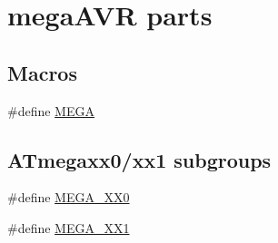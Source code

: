 \hypertarget{group__mega__part__macros__group}{}\section{mega\+A\+VR parts}
\label{group__mega__part__macros__group}
\subsection*{Macros}
\begin{DoxyCompactItemize}
\item 
\#define \mbox{\hyperlink{group__mega__part__macros__group_ga78a6115b485de47c7cc56b224c558ea2}{M\+E\+GA}}
\end{DoxyCompactItemize}
\subsection*{A\+Tmegaxx0/xx1 subgroups}
\begin{DoxyCompactItemize}
\item 
\#define \mbox{\hyperlink{group__mega__part__macros__group_gad59dc6f3c3dc91c94cd1673448135b83}{M\+E\+G\+A\+\_\+\+X\+X0}}
\item 
\#define \mbox{\hyperlink{group__mega__part__macros__group_ga9ed7e955cff24655d99517f91d9f6392}{M\+E\+G\+A\+\_\+\+X\+X1}}
\end{DoxyCompactItemize}
